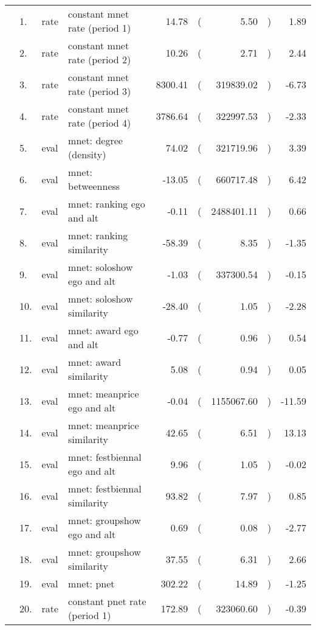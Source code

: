 \begin{table}[ht]
\centering
\begin{tabular}{llllrlrlr}
  \hline
  \hline
  &  1. & rate & constant mnet rate (period 1) & 14.78 & ( & 5.50 & ) & 1.89 \\ 
    &  2. & rate & constant mnet rate (period 2) & 10.26 & ( & 2.71 & ) & 2.44 \\ 
    &  3. & rate & constant mnet rate (period 3) & 8300.41 & ( & 319839.02 & ) & -6.73 \\ 
    &  4. & rate & constant mnet rate (period 4) & 3786.64 & ( & 322997.53 & ) & -2.33 \\ 
    &  5. & eval & mnet: degree (density) & 74.02 & ( & 321719.96 & ) & 3.39 \\ 
    &  6. & eval & mnet: betweenness & -13.05 & ( & 660717.48 & ) & 6.42 \\ 
    &  7. & eval & mnet: ranking ego and alt & -0.11 & ( & 2488401.11 & ) & 0.66 \\ 
    &  8. & eval & mnet: ranking similarity & -58.39 & ( & 8.35 & ) & -1.35 \\ 
    &  9. & eval & mnet: soloshow ego and alt & -1.03 & ( & 337300.54 & ) & -0.15 \\ 
    & 10. & eval & mnet: soloshow similarity & -28.40 & ( & 1.05 & ) & -2.28 \\ 
    & 11. & eval & mnet: award ego and alt & -0.77 & ( & 0.96 & ) & 0.54 \\ 
    & 12. & eval & mnet: award similarity & 5.08 & ( & 0.94 & ) & 0.05 \\ 
    & 13. & eval & mnet: meanprice ego and alt & -0.04 & ( & 1155067.60 & ) & -11.59 \\ 
    & 14. & eval & mnet: meanprice similarity & 42.65 & ( & 6.51 & ) & 13.13 \\ 
    & 15. & eval & mnet: festbiennal ego and alt & 9.96 & ( & 1.05 & ) & -0.02 \\ 
    & 16. & eval & mnet: festbiennal similarity & 93.82 & ( & 7.97 & ) & 0.85 \\ 
    & 17. & eval & mnet: groupshow ego and alt & 0.69 & ( & 0.08 & ) & -2.77 \\ 
    & 18. & eval & mnet: groupshow similarity & 37.55 & ( & 6.31 & ) & 2.66 \\ 
    & 19. & eval & mnet: pnet & 302.22 & ( & 14.89 & ) & -1.25 \\ 
    & 20. & rate & constant pnet rate (period 1) & 172.89 & ( & 323060.60 & ) & -0.39 \\ 

\end{tabular}
\end{table}
